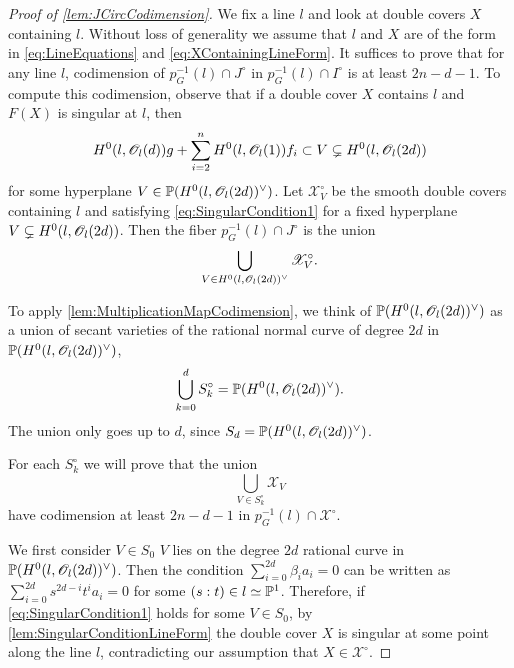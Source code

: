 \begin{proof}[Proof of \cref{lem:JCircCodimension}]
  We fix a line $l$ and look at double covers $X$ containing $l$. Without loss of generality we assume that $l$ and $X$ are of the form in \eqref{eq:LineEquations} and \eqref{eq:XContainingLineForm}. It suffices to prove that for any line $l$, codimension of $p^{-1}_G(l) \cap J^\circ$ in $p^{-1}_G(l) \cap I^\circ$ is at least $2n-d-1$. To compute this codimension, observe that if a double cover $X$ contains $l$ and $F(X)$ is singular at $l$, then 
  \begin{equation}
    \label{eq:SingularCondition1}
        H^0(l,\sO_l(d))g + \sum_{i=2}^nH^0(l,\sO_l(1))f_i \subset V \subsetneq H^0(l,\sO_l(2d))
  \end{equation}
for some hyperplane $V \in \P(H^0(l,\sO_l(2d))^\vee)$. Let $\mathscr{X}^\circ_V$ be the smooth double covers containing $l$ and satisfying \eqref{eq:SingularCondition1} for a fixed hyperplane $V \subsetneq H^0(l,\sO_l(2d))$. Then the fiber $p^{-1}_G(l) \cap J^\circ$ is the union 
\[\bigcup_{V \in H^0(l,\sO_l(2d))^\vee} \mathscr{X}^\circ_V. \]

To apply \cref{lem:MultiplicationMapCodimension}, we think of $\P(H^0(l,\sO_l(2d))^\vee)$ as a union of secant varieties of the rational normal curve of degree $2d$ in $\P(H^0(l,\sO_l(2d))^\vee)$,
\[ \bigcup_{k=0}^{d} S_k^\circ = \P(H^0(l,\sO_l(2d))^\vee).\]
The union only goes up to $d$, since $S_d = \P(H^0(l,\sO_l(2d))^\vee)$.

For each $S_k^\circ$ we will prove that the union
\begin{equation}
  \label{eq:UnionSingular}
  \bigcup_{V \in S_k^\circ} \mathscr{X}_V
\end{equation}
have codimension at least $2n-d-1$ in $p^{-1}_G(l) \cap \mathscr{X}^\circ$.

We first consider $V \in S_0$ \ie $V$ lies on the degree $2d$ rational curve in $\P(H^0(l,\sO_l(2d))^\vee)$. Then the condition $\sum_{i=0}^{2d}\beta_ia_i = 0$ can be written as $\sum_{i=0}^{2d}s^{2d-i}t^ia_i = 0$ for some $(s:t) \in l \simeq \P^1$. Therefore, if \eqref{eq:SingularCondition1} holds for some $V \in S_0$, by \cref{lem:SingularConditionLineForm} the double cover $X$ is singular at some point along the line $l$, contradicting our assumption that $X \in \mathscr{X}^\circ$.


\end{proof}
